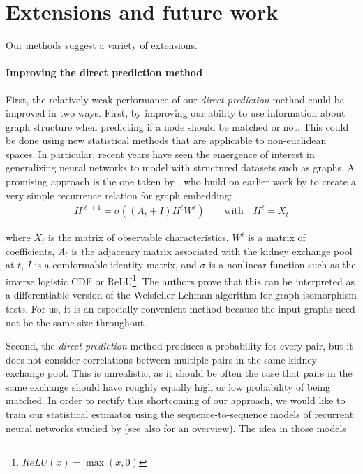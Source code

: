 \section{Extensions and future work} \label{sec:extensions}

Our methods suggest a variety of extensions. 


\paragraph{Improving the direct prediction method}

First, the relatively weak performance of our \emph{direct prediction} method could be improved in two ways. First, by improving our ability to use information about graph structure when predicting if a node should be matched or not. This could be done using new statistical methods that are applicable to non-euclidean spaces\citep{shuman2013emerging}. In particular, recent years have seen the emergence of interest in generalizing neural networks to model with structured datasets such as graphs. A promising approach is the one taken by \cite{kipf2016semi}, who build on earlier work by \cite{defferrard2016convolutional} to create a very simple recurrence relation for graph embedding:
\begin{align}
  H^{\ell + 1} = \sigma((A_{t} + I) H^{\ell}W^{\ell}) \qquad \text{with} \quad H^{\ell} = X_{t}
\end{align}

\noindent where $X_{t}$ is the matrix of observable characteristics, $W^{\ell}$ is a matrix of coefficients, $A_{t}$ is the adjacency matrix associated with the kidney exchange pool at $t$, $I$ is a comformable identity matrix, and $\sigma$ is a nonlinear function such as the inverse logistic CDF or ReLU\footnote{$ReLU(x) = \max(x, 0)$}. The authors prove that this can be interpreted as a differentiable version of the Weisfeiler-Lehman algorithm for graph isomorphism tests. For us, it is an especially convenient method because the input graphs need not be the same size throughout. 


Second, the \emph{direct prediction} method produces a probability for every pair, but it does not consider correlations between multiple pairs in the same kidney exchange pool. This is unrealistic, as it should be often the case that pairs in the same exchange should have roughly equally high or low probability of being matched. In order to rectify this shortcoming of our approach, we would like to train our statistical estimator using the sequence-to-sequence models of recurrent neural networks studied by \cite{sutskever2014sequence} (see also  \citep{lecun2015deep} for an overview). The idea in those models 

